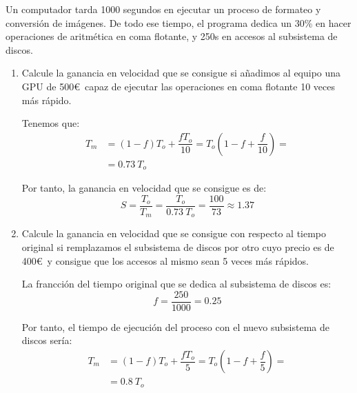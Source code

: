 \begin{comment}
SOLUCIÓN:
\begin{enumerate}
    \item 11,96 s.
    \item Sí.
    \item 6,44 segundos más rápido que el original. 1,39 veces más rápido que el original.
\end{enumerate}
\end{comment}

\begin{ejercicio}
Un computador tarda 1000 segundos en ejecutar un proceso de formateo y conversión de imágenes. De todo ese tiempo, el programa dedica un 30\% en hacer operaciones de aritmética en coma flotante, y 250s en accesos al subsistema de discos.
\begin{enumerate}
    \item Calcule la ganancia en velocidad que se consigue si añadimos al equipo una GPU de 500\euro~capaz de ejecutar las operaciones en coma flotante 10 veces más rápido.
    
    Tenemos que:
    \begin{align*}
        T_m &= (1-f)T_o + \dfrac{fT_o}{10} = T_o\left(1-f+\dfrac{f}{10}\right)
        =\\&= 0.73\ T_o
    \end{align*}

    Por tanto, la ganancia en velocidad que se consigue es de:
    \begin{equation*}
        S = \dfrac{T_o}{T_m} = \dfrac{T_o}{0.73\ T_o} = \dfrac{100}{73} \approx 1.37
    \end{equation*}
    \item Calcule la ganancia en velocidad que se consigue con respecto al tiempo original si remplazamos el subsistema de discos por otro cuyo precio es de 400\euro~y consigue que los accesos al mismo sean 5 veces más rápidos.
    
    La francción del tiempo original que se dedica al subsistema de discos es:
    \begin{equation*}
        f = \dfrac{250}{1000} = 0.25
    \end{equation*}

    Por tanto, el tiempo de ejecución del proceso con el nuevo subsistema de discos sería:
    \begin{align*}
        T_m &= (1-f)T_o + \dfrac{fT_o}{5} = T_o\left(1-f+\dfrac{f}{5}\right)
        =\\&= 0.8\ T_o
    \end{align*}


\end{enumerate}
\end{ejercicio}
